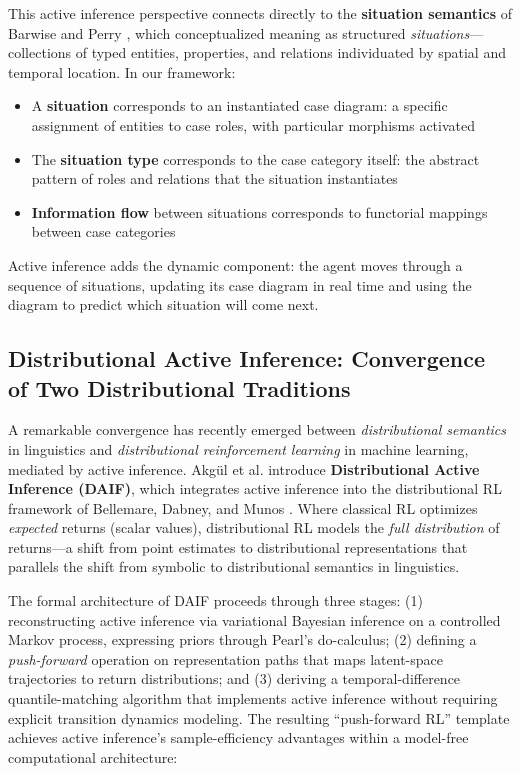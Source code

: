 \documentclass[
]{article}
\providecommand{\tightlist}{%
  \setlength{\itemsep}{0pt}\setlength{\parskip}{0pt}}
\numberwithin{equation}{section}
\begin{document}
This active inference perspective connects directly to the
\textbf{situation semantics} of Barwise and Perry
\citeyearpar{barwise1983situations}, which conceptualized meaning as
structured \emph{situations}---collections of typed entities,
properties, and relations individuated by spatial and temporal location.
In our framework:

\begin{itemize}
\tightlist
\item
  A \textbf{situation} corresponds to an instantiated case diagram: a
  specific assignment of entities to case roles, with particular
  morphisms activated
\item
  The \textbf{situation type} corresponds to the case category itself:
  the abstract pattern of roles and relations that the situation
  instantiates
\item
  \textbf{Information flow} between situations corresponds to functorial
  mappings between case categories
\end{itemize}

Active inference adds the dynamic component: the agent moves through a
sequence of situations, updating its case diagram in real time and using
the diagram to predict which situation will come next.

\subsection{Distributional Active Inference: Convergence of Two
Distributional
Traditions}\label{distributional-active-inference-convergence-of-two-distributional-traditions}

A remarkable convergence has recently emerged between
\emph{distributional semantics} in linguistics and \emph{distributional
reinforcement learning} in machine learning, mediated by active
inference. Akgül et al. \citeyearpar{akgul2026distributional} introduce
\textbf{Distributional Active Inference (DAIF)}, which integrates active
inference into the distributional RL framework of Bellemare, Dabney, and
Munos \citeyearpar{bellemare2017distributional}. Where classical RL
optimizes \emph{expected} returns (scalar values), distributional RL
models the \emph{full distribution} of returns---a shift from point
estimates to distributional representations that parallels the shift
from symbolic to distributional semantics in linguistics.

The formal architecture of DAIF proceeds through three stages: (1)
reconstructing active inference via variational Bayesian inference on a
controlled Markov process, expressing priors through Pearl's
do-calculus; (2) defining a \emph{push-forward} operation on
representation paths that maps latent-space trajectories to return
distributions; and (3) deriving a temporal-difference quantile-matching
algorithm that implements active inference without requiring explicit
transition dynamics modeling. The resulting ``push-forward RL'' template
achieves active inference's sample-efficiency advantages within a
model-free computational architecture:
\end{document}
